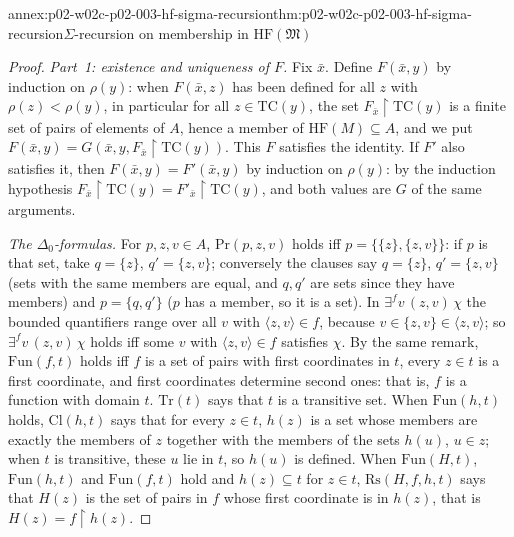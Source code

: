 \begin{annexitem}{annex:p02-w02c-p02-003-hf-sigma-recursion}{thm:p02-w02c-p02-003-hf-sigma-recursion}{\(\Sigma\)-recursion on membership in \(\mathrm{HF}(\mathfrak M)\)}
\begin{proof}
\emph{Part~1: existence and uniqueness of \(F\).}  Fix \(\bar x\).  Define
\(F(\bar x,y)\) by induction on \(\rho(y)\): when \(F(\bar x,z)\) has been
defined for all \(z\) with \(\rho(z)<\rho(y)\), in particular for all
\(z\in\mathrm{TC}(y)\), the set \(F_{\bar x}\restriction\mathrm{TC}(y)\)
is a finite set of pairs of elements of \(A\), hence a member of
\(\mathrm{HF}(M)\subseteq A\), and we put \(F(\bar x,y)=G(\bar x,y,F_{\bar
x}\restriction\mathrm{TC}(y))\).  This \(F\) satisfies the identity.  If
\(F'\) also satisfies it, then \(F(\bar x,y)=F'(\bar x,y)\) by induction
on \(\rho(y)\): by the induction hypothesis \(F_{\bar
x}\restriction\mathrm{TC}(y)=F'_{\bar x}\restriction\mathrm{TC}(y)\), and
both values are \(G\) of the same arguments.

\emph{The \(\Delta_0\)-formulas.}  For \(p,z,v\in A\),
\(\mathrm{Pr}(p,z,v)\) holds iff \(p=\{\{z\},\{z,v\}\}\): if \(p\) is that
set, take \(q=\{z\}\), \(q'=\{z,v\}\); conversely the clauses say
\(q=\{z\}\), \(q'=\{z,v\}\) (sets with the same members are equal, and
\(q,q'\) are sets since they have members) and \(p=\{q,q'\}\) (\(p\) has a
member, so it is a set).  In
\(\exists^{f}v\,(z,v)\,\chi\) the bounded quantifiers range over all
\(v\) with \(\langle z,v\rangle\in f\), because \(v\in\{z,v\}\in\langle
z,v\rangle\); so \(\exists^{f}v\,(z,v)\,\chi\) holds iff some \(v\) with
\(\langle z,v\rangle\in f\) satisfies \(\chi\).  By the same remark,
\(\mathrm{Fun}(f,t)\) holds iff \(f\) is a set of pairs with first
coordinates in \(t\), every \(z\in t\) is a first coordinate, and first
coordinates determine second ones: that is, \(f\) is a function with
domain \(t\).  \(\mathrm{Tr}(t)\) says that \(t\) is a transitive set.
When \(\mathrm{Fun}(h,t)\) holds, \(\mathrm{Cl}(h,t)\) says that for
every \(z\in t\), \(h(z)\) is a set whose members are exactly the members
of \(z\) together with the members of the sets \(h(u)\), \(u\in z\); when
\(t\) is transitive, these \(u\) lie in \(t\), so \(h(u)\) is defined.
When \(\mathrm{Fun}(H,t)\), \(\mathrm{Fun}(h,t)\) and \(\mathrm{Fun}(f,t)\)
hold and \(h(z)\subseteq t\) for \(z\in t\), \(\mathrm{Rs}(H,f,h,t)\)
says that \(H(z)\) is the set of pairs in \(f\) whose first coordinate is
in \(h(z)\), that is \(H(z)=f\restriction h(z)\).


\end{proof}
\end{annexitem}
